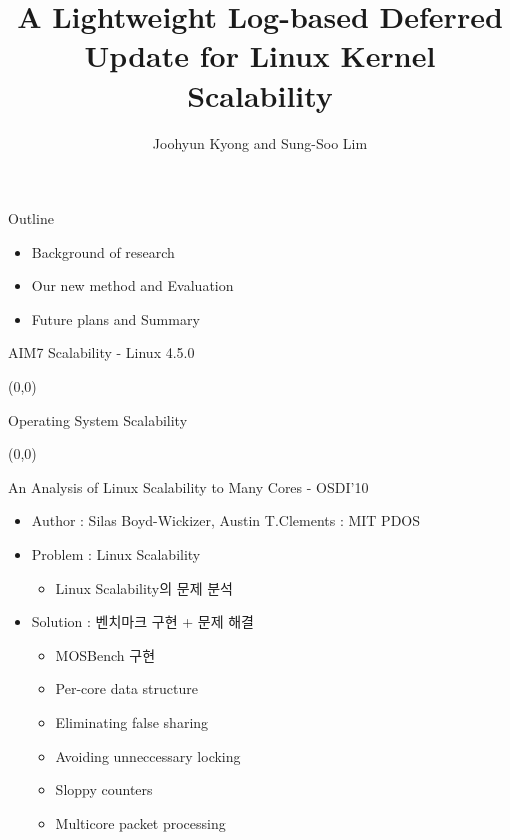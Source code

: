 \documentclass[english]{beamer} %
\begin{document}
\title[Memory Scalability]{
A Lightweight Log-based Deferred Update for Linux Kernel
Scalability}

\author{Joohyun Kyong and Sung-Soo Lim}


\begin{frame}
  \titlepage
\end{frame}

\begin{frame}{Outline}
	\begin{itemize}
	\item Background of research 
	\item Our new method and Evaluation
	\item Future plans and Summary
	\end{itemize}
\end{frame}

\begin{frame}{AIM7 Scalability - Linux 4.5.0}
\begin{textblock}{1}(0,0)
\end{textblock}
\end{frame}

\begin{frame}{Operating System Scalability}
\begin{textblock}{1}(0,0)
\end{textblock}
\end{frame}

\begin{frame}{An Analysis of Linux Scalability to Many Cores - OSDI'10}
    \begin{itemize}
    \item Author : Silas Boyd-Wickizer, Austin T.Clements : MIT PDOS
    \item Problem : Linux Scalability 
        \begin{itemize}
        \item Linux Scalability의 문제 분석
        \end{itemize}
    \item Solution : 벤치마크 구현 + 문제 해결
        \begin{itemize}
        \item MOSBench 구현
        \item Per-core data structure 
        \item Eliminating false sharing
        \item Avoiding unneccessary locking
        \item Sloppy counters
        \item Multicore packet processing
        \end{itemize}
    \end{itemize}
\end{frame}
\end{document}
